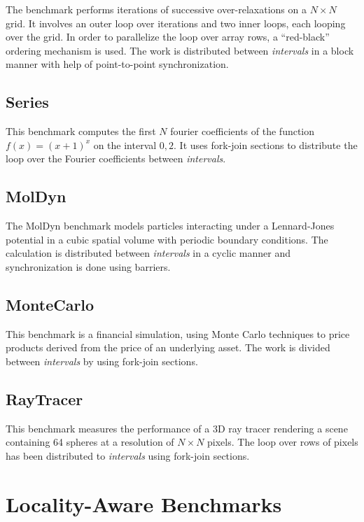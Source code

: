 The benchmark performs iterations of successive over-relaxations on a
$N \times N$ grid. It involves an outer loop over iterations and two
inner loops, each looping over the grid. In order to parallelize the
loop over array rows, a ``red-black'' ordering mechanism is used. The
work is distributed between \emph{intervals} in a block manner with
help of point-to-point synchronization.

\subsection*{Series}

This benchmark computes the first $N$ fourier coefficients of the
function $f(x) = (x+1)^x$ on the interval $0,2$. It uses fork-join
sections to distribute the loop over the Fourier coefficients between
\emph{intervals}.

\subsection*{MolDyn}

The MolDyn benchmark models particles interacting under a
Lennard-Jones potential in a cubic spatial volume with periodic
boundary conditions. The calculation is distributed between
\emph{intervals} in a cyclic manner and synchronization is done using
barriers.

\subsection*{MonteCarlo}

This benchmark is a financial simulation, using Monte Carlo techniques
to price products derived from the price of an underlying asset. The
work is divided between \emph{intervals} by using fork-join sections.

\subsection*{RayTracer}

This benchmark measures the performance of a 3D ray tracer rendering a
scene containing 64 spheres at a resolution of $N \times N$
pixels. The loop over rows of pixels has been distributed to
\emph{intervals} using fork-join sections.


\section{Locality-Aware Benchmarks}

